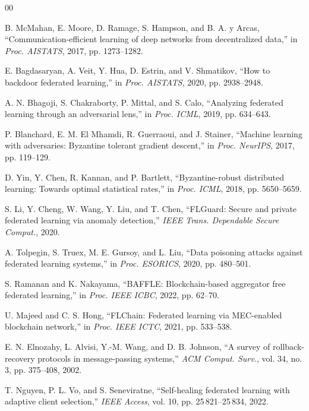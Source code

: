 \documentclass[conference]{IEEEtran}
\begin{document}
\begin{thebibliography}{00}

 B. McMahan, E. Moore, D. Ramage, S. Hampson, and B. A. y Arcas, ``Communication-efficient learning of deep networks from decentralized data,'' in \textit{Proc. AISTATS}, 2017, pp. 1273--1282.

 E. Bagdasaryan, A. Veit, Y. Hua, D. Estrin, and V. Shmatikov, ``How to backdoor federated learning,'' in \textit{Proc. AISTATS}, 2020, pp. 2938--2948.

 A. N. Bhagoji, S. Chakraborty, P. Mittal, and S. Calo, ``Analyzing federated learning through an adversarial lens,'' in \textit{Proc. ICML}, 2019, pp. 634--643.

 P. Blanchard, E. M. El Mhamdi, R. Guerraoui, and J. Stainer, ``Machine learning with adversaries: Byzantine tolerant gradient descent,'' in \textit{Proc. NeurIPS}, 2017, pp. 119--129.

 D. Yin, Y. Chen, R. Kannan, and P. Bartlett, ``Byzantine-robust distributed learning: Towards optimal statistical rates,'' in \textit{Proc. ICML}, 2018, pp. 5650--5659.

 S. Li, Y. Cheng, W. Wang, Y. Liu, and T. Chen, ``FLGuard: Secure and private federated learning via anomaly detection,'' \textit{IEEE Trans. Dependable Secure Comput.}, 2020.

 A. Tolpegin, S. Truex, M. E. Gursoy, and L. Liu, ``Data poisoning attacks against federated learning systems,'' in \textit{Proc. ESORICS}, 2020, pp. 480--501.

 S. Ramanan and K. Nakayama, ``BAFFLE: Blockchain-based aggregator free federated learning,'' in \textit{Proc. IEEE ICBC}, 2022, pp. 62--70.

 U. Majeed and C. S. Hong, ``FLChain: Federated learning via MEC-enabled blockchain network,'' in \textit{Proc. IEEE ICTC}, 2021, pp. 533--538.

 E. N. Elnozahy, L. Alvisi, Y.-M. Wang, and D. B. Johnson, ``A survey of rollback-recovery protocols in message-passing systems,'' \textit{ACM Comput. Surv.}, vol. 34, no. 3, pp. 375--408, 2002.

 T. Nguyen, P. L. Vo, and S. Seneviratne, ``Self-healing federated learning with adaptive client selection,'' \textit{IEEE Access}, vol. 10, pp. 25\,821--25\,834, 2022.


\end{thebibliography}
\end{document}
